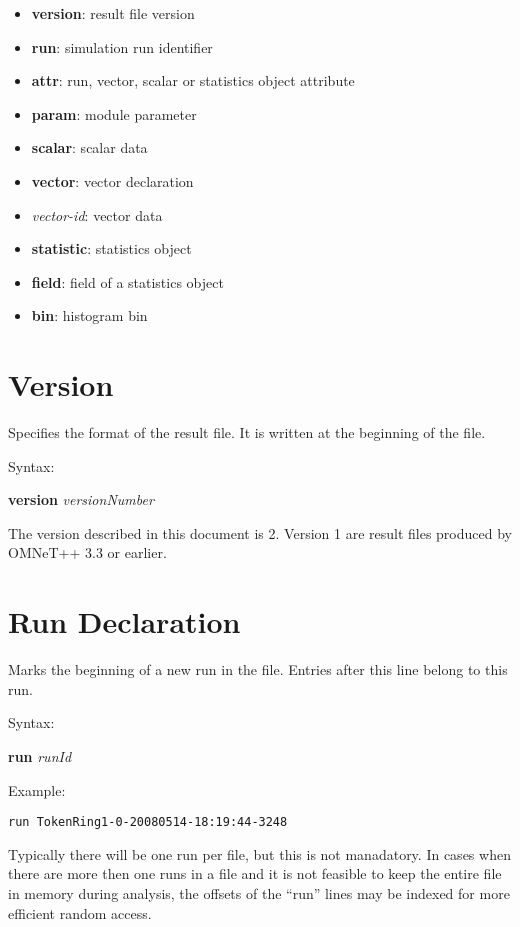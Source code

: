 \begin{itemize}
    \item \textbf{version}: result file version
    \item \textbf{run}: simulation run identifier
    \item \textbf{attr}: run, vector, scalar or statistics object attribute
    \item \textbf{param}: module parameter
    \item \textbf{scalar}: scalar data
    \item \textbf{vector}: vector declaration
    \item \textit{vector-id}: vector data
    \item \textbf{statistic}: statistics object
    \item \textbf{field}: field of a statistics object
    \item \textbf{bin}: histogram bin
\end{itemize}



\section{Version}

Specifies the format of the result file. It is written at the beginning of the file.

Syntax:

\hspace{20mm} \textbf{version} \textit{versionNumber}

The version described in this document is 2. Version 1 are result files produced
by OMNeT++ 3.3 or earlier.



\section{Run Declaration}

Marks the beginning of a new run in the file. Entries after this line
belong to this run.

Syntax:

\hspace{20mm} \textbf{run} \textit{runId}

Example:

\begin{verbatim}
run TokenRing1-0-20080514-18:19:44-3248
\end{verbatim}

Typically there will be one run per file, but this is not manadatory.
In cases when there are more then one runs in a file and it is not feasible
to keep the entire file in memory during analysis, the offsets of the ``run''
lines may be indexed for more efficient random access.


